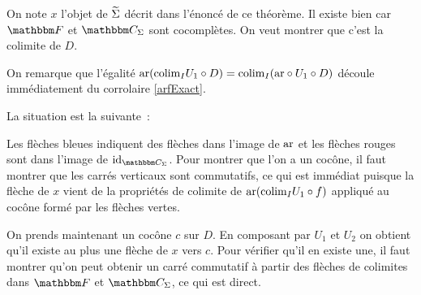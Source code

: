 \begin{pv}
    On note $x$ l'objet de $\widetilde{\Sigma}$ décrit dans l'énoncé de ce théorème. Il existe
    bien car $\cf$ et $\C_\Sigma$ sont cocomplètes. On veut
    montrer que c'est la colimite de $D$.

    On remarque que l'égalité $\text{ar}(\text{colim}_I U_1\circ D) = \text{colim}_I (\text{ar}\circ U_1\circ D)$
    découle immédiatement du corrolaire \ref{arfExact}.

    La situation est la suivante~:

    \begin{center}\end{center}

    Les flèches bleues indiquent des flèches dans l'image de $\text{ar}$ et les flèches
    rouges sont dans l'image de $\id_{\C_\Sigma}$. Pour montrer que l'on a un cocône,
    il faut montrer que les carrés verticaux sont commutatifs, ce qui est immédiat
    puisque la flèche de $x$ vient de la propriétés de colimite de
    $\text{ar}(\text{colim}_I U_1\circ f)$ appliqué au cocône formé par les flèches vertes.

    On prends maintenant un cocône $c$ sur $D$. En composant par $U_1$ et $U_2$ on obtient
    qu'il existe au plus une flèche de $x$ vers $c$. Pour vérifier qu'il en existe une,
    il faut montrer qu'on peut obtenir un carré commutatif à partir des flèches de
    colimites dans $\cf$ et $\C_\Sigma$, ce qui est direct.
\end{pv}

